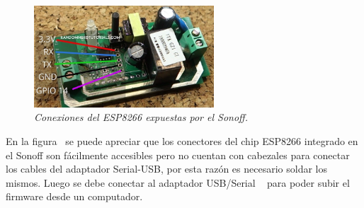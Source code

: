 \begin{figure}[h]
  \centering
  \includegraphics[width=0.6\textwidth, keepaspectratio]{images/sonoff-gpio}
  \caption{\textit{Conexiones del ESP8266 expuestas por el Sonoff.}}
  \label{fig:sonoff-gpio}
\end{figure}
En la figura~ se puede apreciar que los conectores del chip ESP8266 integrado en el Sonoff son fácilmente accesibles pero no cuentan con cabezales para conectar los cables del adaptador Serial-USB, por esta razón es necesario soldar los mismos.
Luego se debe conectar al adaptador USB/Serial ~ para poder subir el firmware desde un computador. 


